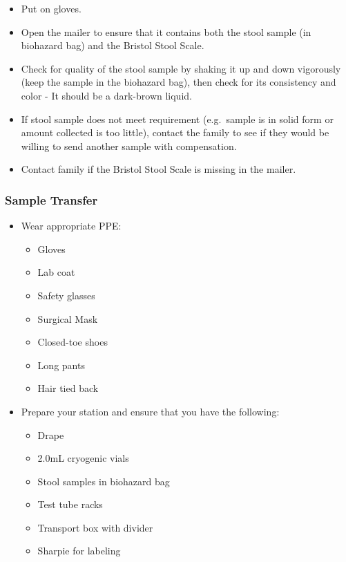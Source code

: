 \documentclass[]{book}
\providecommand{\tightlist}{%
  \setlength{\itemsep}{0pt}\setlength{\parskip}{0pt}}
\begin{document}
\begin{itemize}
\tightlist
\item
  Put on gloves.
\item
  Open the mailer to ensure that it contains both the stool sample (in biohazard bag) and the Bristol Stool Scale.
\item
  Check for quality of the stool sample by shaking it up and down vigorously (keep the sample in the biohazard bag), then check for its consistency and color - It should be a dark-brown liquid.
\item
  If stool sample does not meet requirement (e.g.~sample is in solid form or amount collected is too little), contact the family to see if they would be willing to send another sample with compensation.
\item
  Contact family if the Bristol Stool Scale is missing in the mailer.
\end{itemize}

\hypertarget{sample-transfer}{%
\subsubsection{Sample Transfer}\label{sample-transfer}}

\begin{itemize}
\tightlist
\item
  Wear appropriate PPE:

  \begin{itemize}
  \tightlist
  \item
    Gloves
  \item
    Lab coat
  \item
    Safety glasses
  \item
    Surgical Mask
  \item
    Closed-toe shoes
  \item
    Long pants
  \item
    Hair tied back
  \end{itemize}
\item
  Prepare your station and ensure that you have the following:

  \begin{itemize}
  \tightlist
  \item
    Drape
  \item
    2.0mL cryogenic vials
  \item
    Stool samples in biohazard bag
  \item
    Test tube racks
  \item
    Transport box with divider
  \item
    Sharpie for labeling
  \end{itemize}
\end{itemize}
\end{document}
